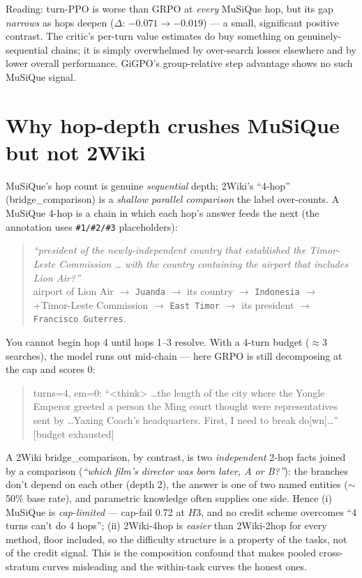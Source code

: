 \documentclass[11pt]{article}
\newcommand{\bad}[1]{\textcolor{red!70!black}{#1}}
\begin{document}
Reading: turn-PPO is worse than GRPO at \emph{every} MuSiQue hop, but its gap \emph{narrows} as hops
deepen ($\Delta$: $-0.071\to-0.019$) --- a small, significant positive contrast. The critic's per-turn
value estimates do buy something on genuinely-sequential chains; it is simply overwhelmed by
over-search losses elsewhere and by lower overall performance. GiGPO's group-relative step advantage
shows no such MuSiQue signal.

\section{Why hop-depth crushes MuSiQue but not 2Wiki}\label{sec:why}
MuSiQue's hop count is genuine \emph{sequential} depth; 2Wiki's ``4-hop'' (bridge\_comparison) is a
\emph{shallow parallel comparison} the label over-counts. A MuSiQue 4-hop is a chain in which each
hop's answer feeds the next (the annotation uses \texttt{\#1/\#2/\#3} placeholders):
\begin{quote}\small
\emph{``president of the newly-independent country that established the Timor-Leste Commission \dots
with the country containing the airport that includes Lion Air?''}\\
airport of Lion Air $\to$ \texttt{Juanda} $\to$ its country $\to$ \texttt{Indonesia} $\to$ +Timor-Leste
Commission $\to$ \texttt{East Timor} $\to$ its president $\to$ \texttt{Francisco Guterres}.
\end{quote}
You cannot begin hop 4 until hops 1--3 resolve. With a 4-turn budget ($\approx$3 searches), the model
runs out mid-chain --- here GRPO is still decomposing at the cap and scores 0:
\begin{quote}\ttfamily\scriptsize
turns=4, em=0: ``<think> \dots the length of the city where the Yongle Emperor greeted a person the
Ming court thought were representatives sent by \dots Yaxing Coach's headquarters. First, I need to
break do[wn]\dots'' \bad{[budget exhausted]}
\end{quote}
A 2Wiki bridge\_comparison, by contrast, is two \emph{independent} 2-hop facts joined by a comparison
(\emph{``which film's director was born later, A or B?''}): the branches don't depend on each other
(depth 2), the answer is one of two named entities ($\sim$50\% base rate), and parametric knowledge
often supplies one side. Hence (i) MuSiQue is \emph{cap-limited} --- cap-fail 0.72 at $H3$, and no
credit scheme overcomes ``4 turns can't do 4 hops''; (ii) 2Wiki-4hop is \emph{easier} than
2Wiki-2hop for every method, floor included, so the difficulty structure is a property of the tasks,
not of the credit signal. This is the composition confound that makes pooled cross-stratum curves
misleading and the within-task curves the honest ones.
\end{document}

